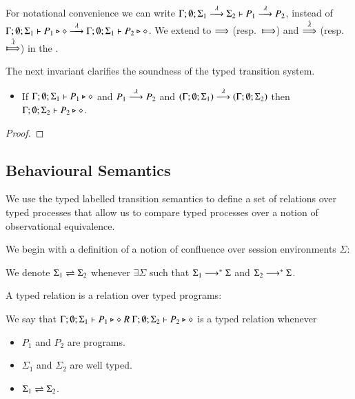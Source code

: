 For notational convenience we can write
$\Gamma; \emptyset; \Sigma_1 \stackrel{\lambda}{\longrightarrow} \Sigma_2 \vdash P_1 \stackrel{\lambda}{\longrightarrow} P_2$,
instead of $\Gamma; \emptyset; \Sigma_1 \vdash P_1 \triangleright \diamond \stackrel{\lambda}{\longrightarrow} \Gamma; \emptyset; \Sigma_1 \vdash P_2 \triangleright \diamond$.
We extend to $\stackrel{}{\Longrightarrow}$ (resp.\ $\Hby{}$) and $\stackrel{\hat{\lambda}}{\Longrightarrow}$ (resp.\ $\Hby{\hat{\lambda}}$) in the .

The next invariant clarifies the soundness of the
typed transition system.

\begin{lemma}[Invariant]
	\begin{itemize}
		\item	If $\Gamma; \emptyset; \Sigma_1 \vdash P_1 \triangleright \diamond$ and
			$P_1 \stackrel{\lambda}{\longrightarrow} P_2$ and $(\Gamma; \emptyset; \Sigma_1) \stackrel{\lambda}{\longrightarrow} (\Gamma; \emptyset; \Sigma_2)$
			then $\Gamma; \emptyset; \Sigma_2 \vdash P_2 \triangleright \diamond$.
	\end{itemize}
\end{lemma}

\begin{proof}
\end{proof}

\subsection{Behavioural Semantics}

We use the typed labelled transition semantics to define
a set of relations over typed processes that allow us to compare
typed processes over a notion of observational equivalence.


We begin with a definition of a notion of confluence
over session environments $\Sigma$:
\begin{definition}\rm
	We denote $\Sigma_1 \rightleftharpoons \Sigma_2$ whenever $\exists \Sigma$ such that
	$\Sigma_1 \longrightarrow^* \Sigma$ and $\Sigma_2 \longrightarrow^* \Sigma$.
\end{definition}


A typed relation is a relation over typed programs:

\begin{definition}\rm
	We say that
	$\Gamma; \emptyset; \Sigma_1 \vdash P_1 \triangleright \diamond\ R\ \Gamma; \emptyset; \Sigma_2 \vdash P_2 \triangleright \diamond$
	is a typed relation whenever
	\begin{itemize}
		\item	$P_1$ and $P_2$ are programs.
		\item	$\Sigma_1$ and $\Sigma_2$ are well typed.
		\item	$\Sigma_1 \rightleftharpoons \Sigma_2$.
	\end{itemize}
\end{definition}

